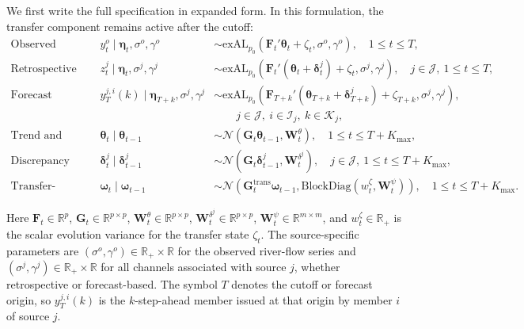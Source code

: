 \documentclass[APA,STIX1COL]{WileyNJD-v2}
\begin{document}
We first write the full specification in expanded form. In this formulation, the transfer component remains active after the cutoff:
\begin{align}
\text{Observed measurements:}&&
y_t^o \mid \boldsymbol{\eta}_t, \sigma^o, \gamma^o
&\sim \text{exAL}_{p_0}\!\left(\mathbf{F}_t' \boldsymbol{\theta}_t + \zeta_t, \sigma^o, \gamma^o\right),
\quad 1 \le t \le T, \label{eq:unified_usgs}
\\
\text{Retrospective products:}&&
z_t^j \mid \boldsymbol{\eta}_t, \sigma^j, \gamma^j
&\sim \text{exAL}_{p_0}\!\left(\mathbf{F}_t'(\boldsymbol{\theta}_t + \boldsymbol{\delta}_t^j) + \zeta_t, \sigma^j, \gamma^j\right),
\quad j \in \mathcal{J},\ 1 \le t \le T, \label{eq:unified_retro}
\\
\text{Forecast products:}&&
y_T^{j,i}(k) \mid \boldsymbol{\eta}_{T+k}, \sigma^j, \gamma^j
&\sim \text{exAL}_{p_0}\!\left(\mathbf{F}_{T+k}'(\boldsymbol{\theta}_{T+k} + \boldsymbol{\delta}_{T+k}^j) + \zeta_{T+k}, \sigma^j, \gamma^j\right), \nonumber\\
&&&
\qquad j \in \mathcal{J},\ i \in \mathcal{I}_j,\ k \in \mathcal{K}_j, \label{eq:unified_forecast}
\\
\text{Trend and seasonal states:}&&
\boldsymbol{\theta}_t \mid \boldsymbol{\theta}_{t-1}
&\sim \mathcal{N}\!\left(\mathbf{G}_t \boldsymbol{\theta}_{t-1}, \mathbf{W}_t^\theta\right),
\quad 1 \le t \le T+K_{\max}, \label{eq:unified_theta}
\\
\text{Discrepancy states:}&&
\boldsymbol{\delta}_t^j \mid \boldsymbol{\delta}_{t-1}^j
&\sim \mathcal{N}\!\left(\mathbf{G}_t \boldsymbol{\delta}_{t-1}^j, \mathbf{W}_t^{\delta^j}\right),
\quad j \in \mathcal{J},\ 1 \le t \le T+K_{\max}, \label{eq:unified_delta}
\\
\text{Transfer-function states:}&&
\boldsymbol{\omega}_t \mid \boldsymbol{\omega}_{t-1}
&\sim \mathcal{N}\!\left(
\mathbf{G}^{\text{trans}}_t \boldsymbol{\omega}_{t-1},
\text{BlockDiag}\!\left(w_t^\zeta, \mathbf{W}_t^\psi\right)
\right),
\quad 1 \le t \le T+K_{\max}. \label{eq:unified_transfer}
\end{align}

Here \(\mathbf{F}_t \in \mathbb{R}^{p}\), \(\mathbf{G}_t \in \mathbb{R}^{p\times p}\), \(\mathbf{W}_t^\theta \in \mathbb{R}^{p\times p}\), \(\mathbf{W}_t^{\delta^j} \in \mathbb{R}^{p\times p}\), \(\mathbf{W}_t^\psi \in \mathbb{R}^{m\times m}\), and \(w_t^\zeta \in \mathbb{R}_+\) is the scalar evolution variance for the transfer state \(\zeta_t\). The source-specific parameters are \((\sigma^o,\gamma^o) \in \mathbb{R}_+ \times \mathbb{R}\) for the observed river-flow series and \((\sigma^j,\gamma^j) \in \mathbb{R}_+ \times \mathbb{R}\) for all channels associated with source \(j\), whether retrospective or forecast-based. The symbol \(T\) denotes the cutoff or forecast origin, so \(y_T^{j,i}(k)\) is the \(k\)-step-ahead member issued at that origin by member \(i\) of source \(j\).
\end{document}
